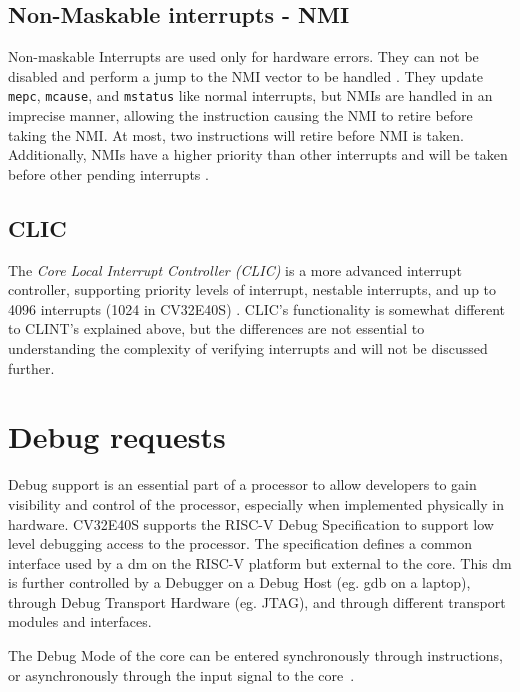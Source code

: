 \subsection{Non-Maskable interrupts - NMI}

Non-maskable Interrupts are used only for hardware errors. They can not be disabled and perform a jump to the NMI vector to be handled \cite{watermanRISCVInstructionSet2021}. They update \lstinline{mepc}, \lstinline{mcause}, and \lstinline{mstatus} like normal interrupts, but NMIs are handled in an imprecise manner, allowing the instruction causing the NMI to retire before taking the NMI. At most, two instructions will retire before NMI is taken. 
Additionally, NMIs have a higher priority than other interrupts and will be taken before other pending interrupts \cite{openhwgroupExceptionsInterruptsCOREV2023}.

\subsection{CLIC}

The \textit{Core Local Interrupt Controller (CLIC)} is a more advanced interrupt controller, supporting priority levels of interrupt, nestable interrupts, and up to 4096 interrupts (1024 in CV32E40S) \cite{openhwgroupExceptionsInterruptsCOREV2023}. CLIC's functionality is somewhat different to CLINT's explained above, but the differences are not essential to understanding the complexity of verifying interrupts and will not be discussed further. 



\section{Debug requests}
\label{sec:bg_debug}

Debug support is an essential part of a processor to allow developers to gain visibility and control of the processor, especially when implemented physically in hardware. CV32E40S supports the RISC-V Debug Specification \cite{pauldonahueRISCVDebugSupport2023} to support low level debugging access to the processor. The specification defines a common interface used by a \acrfull{dm} on the RISC-V platform but external to the core. This \acrshort{dm} is further controlled by a Debugger on a Debug Host (eg. gdb on a laptop), through Debug Transport Hardware (eg. JTAG), and through different transport modules and interfaces. 

The Debug Mode of the core can be entered synchronously through  instructions, or asynchronously through the  input signal to the core~\cite{openhwgroupDebugTriggerCOREV2023}.

